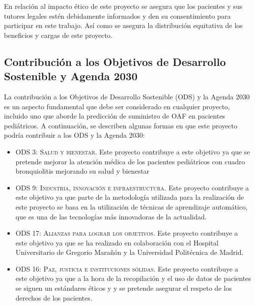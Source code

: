 En relación al impacto ético de este proyecto se asegura que los pacientes y sus tutores legales estén debidamente informados y den su consentimiento para participar en este trabajo. Así como se asegura la distribución equitativa de los beneficios y cargas de este proyecto.
\newpage

\subsection{Contribución a los Objetivos de Desarrollo Sostenible y Agenda 2030}

La contribución a los Objetivos de Desarrollo Sostenible (ODS) y la Agenda 2030 es un aspecto fundamental que debe ser considerado en cualquier proyecto, incluido uno que aborde la predicción de suministro de OAF en pacientes pediátricos. A continuación, se describen algunas formas en que este proyecto podría contribuir a los ODS y la Agenda 2030:

\begin{itemize}
    \item \textsc{ODS 3: Salud y bienestar.} Este proyecto contribuye a este objetivo ya que se pretende mejorar la atención médica de los pacientes pediátricos con cuadro bronquiolitis mejorando su salud y bienestar
    \item \textsc{ODS 9: Industria, innovación e infraestructura.} Este proyecto contribuye a este objetivo ya que parte de la metodología utilizada para la realización de este proyecto se basa en la utilización de técnicas de aprendizaje automático, que es una de las tecnologías más innovadoras de la actualidad.
    \item \textsc{ODS 17: Alianzas para lograr los objetivos.} Este proyecto contribuye a este objetivo ya que se ha realizado en colaboración con el Hospital Universitario de Gregorio Marañón y la Universidad Politécnica de Madrid.
    \item \textsc{ODS 16: Paz, justicia e instituciones sólidas.} Este proyecto contribuye a este objetivo ya que a la hora de la recopilación y el uso de datos de pacientes se siguen un estándares éticos y y se pretende asegurar el respeto de los derechos de los pacientes.
\end{itemize}

